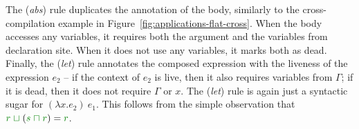 The (\emph{abs}) rule duplicates the annotation of the body, similarly to the cross-compilation
example in Figure~\ref{fig:applications-flat-cross}. When the body accesses any variables, it
requires both the argument and the variables from declaration site. When it does not use any variables,
it marks both as dead. Finally, the (\emph{let}) rule annotates the composed expression with the
liveness of the expression $e_2$ -- if the context of $e_2$ is live, then it also requires variables
from $\Gamma$; if it is dead, then it does not require $\Gamma$ or $x$.
The (\emph{let}) rule is again just a syntactic sugar for
$(\lambda x.e_2)~e_1$. This follows from the simple observation that
$\cclrd{r} \;\cclrd{\sqcup}\; (\cclrd{s} \;\cclrd{\sqcap}\; \cclrd{r}) = \cclrd{r}$.


